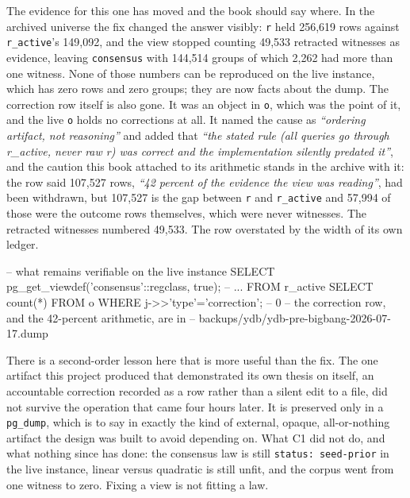 The evidence for this one has moved and the book should say where. In the archived universe the fix changed the answer visibly: \texttt{r} held 256,619 rows against \texttt{r\_active}'s 149,092, and the view stopped counting 49,533 retracted witnesses as evidence, leaving \texttt{consensus} with 144,514 groups of which 2,262 had more than one witness. None of those numbers can be reproduced on the live instance, which has zero rows and zero groups; they are now facts about the dump. The correction row itself is also gone. It was an object in \texttt{o}, which was the point of it, and the live \texttt{o} holds no corrections at all. It named the cause as \textit{``ordering artifact, not reasoning''} and added that \textit{``the stated rule (all queries go through r\_active, never raw r) was correct and the implementation silently predated it''}, and the caution this book attached to its arithmetic stands in the archive with it: the row said 107,527 rows, \textit{``42 percent of the evidence the view was reading''}, had been withdrawn, but 107,527 is the gap between \texttt{r} and \texttt{r\_active} and 57,994 of those were the outcome rows themselves, which were never witnesses. The retracted witnesses numbered 49,533. The row overstated by the width of its own ledger.

\begin{Check}
-- what remains verifiable on the live instance
SELECT pg_get_viewdef('consensus'::regclass, true);   -- ... FROM r_active
SELECT count(*) FROM o WHERE j->>'type'='correction'; -- 0
-- the correction row, and the 42-percent arithmetic, are in
--   backups/ydb/ydb-pre-bigbang-2026-07-17.dump
\end{Check}

There is a second-order lesson here that is more useful than the fix. The one artifact this project produced that demonstrated its own thesis on itself, an accountable correction recorded as a row rather than a silent edit to a file, did not survive the operation that came four hours later. It is preserved only in a \texttt{pg\_dump}, which is to say in exactly the kind of external, opaque, all-or-nothing artifact the design was built to avoid depending on. What C1 did not do, and what nothing since has done: the consensus law is still \texttt{status: seed-prior} in the live instance, linear versus quadratic is still unfit, and the corpus went from one witness to zero. Fixing a view is not fitting a law.

